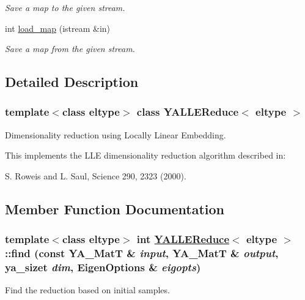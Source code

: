 \begin{CompactItemize}
\begin{CompactList}\small\item\em Save a map to the given stream. \item\end{CompactList}\item 
\hypertarget{class_y_a_l_l_e_reduce_a12}{
int \hyperlink{class_y_a_l_l_e_reduce_a12}{load\_\-map} (istream \&in)}
\label{class_y_a_l_l_e_reduce_a12}

\begin{CompactList}\small\item\em Save a map from the given stream. \item\end{CompactList}\end{CompactItemize}


\subsection{Detailed Description}
\subsubsection*{template$<$class eltype$>$ class YALLEReduce$<$ eltype $>$}

Dimensionality reduction using Locally Linear Embedding. 

This implements the LLE dimensionality reduction algorithm described in:

S. Roweis and L. Saul, Science 290, 2323 (2000). 



\subsection{Member Function Documentation}
\hypertarget{class_y_a_l_l_e_reduce_a8}{
\subsubsection[find]{\setlength{\rightskip}{0pt plus 5cm}template$<$class eltype$>$ int \hyperlink{class_y_a_l_l_e_reduce}{YALLEReduce}$<$ eltype $>$::find (const YA\_\-Mat\-T \& {\em input}, YA\_\-Mat\-T \& {\em output}, ya\_\-sizet {\em dim}, Eigen\-Options \& {\em eigopts})}}
\label{class_y_a_l_l_e_reduce_a8}


Find the reduction based on initial samples. 

